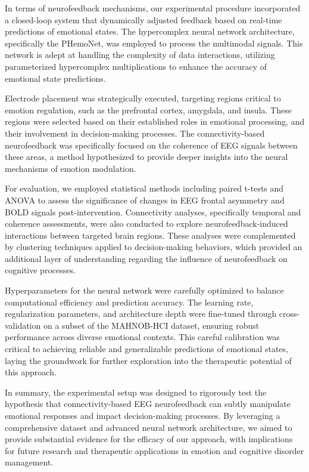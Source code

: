 \documentclass{article}
\begin{document}
In terms of neurofeedback mechanisms, our experimental procedure incorporated a closed-loop system that dynamically adjusted feedback based on real-time predictions of emotional states. The hypercomplex neural network architecture, specifically the PHemoNet, was employed to process the multimodal signals. This network is adept at handling the complexity of data interactions, utilizing parameterized hypercomplex multiplications to enhance the accuracy of emotional state predictions.

Electrode placement was strategically executed, targeting regions critical to emotion regulation, such as the prefrontal cortex, amygdala, and insula. These regions were selected based on their established roles in emotional processing, and their involvement in decision-making processes. The connectivity-based neurofeedback was specifically focused on the coherence of EEG signals between these areas, a method hypothesized to provide deeper insights into the neural mechanisms of emotion modulation.

For evaluation, we employed statistical methods including paired t-tests and ANOVA to assess the significance of changes in EEG frontal asymmetry and BOLD signals post-intervention. Connectivity analyses, specifically temporal and coherence assessments, were also conducted to explore neurofeedback-induced interactions between targeted brain regions. These analyses were complemented by clustering techniques applied to decision-making behaviors, which provided an additional layer of understanding regarding the influence of neurofeedback on cognitive processes.

Hyperparameters for the neural network were carefully optimized to balance computational efficiency and prediction accuracy. The learning rate, regularization parameters, and architecture depth were fine-tuned through cross-validation on a subset of the MAHNOB-HCI dataset, ensuring robust performance across diverse emotional contexts. This careful calibration was critical to achieving reliable and generalizable predictions of emotional states, laying the groundwork for further exploration into the therapeutic potential of this approach.

In summary, the experimental setup was designed to rigorously test the hypothesis that connectivity-based EEG neurofeedback can subtly manipulate emotional responses and impact decision-making processes. By leveraging a comprehensive dataset and advanced neural network architecture, we aimed to provide substantial evidence for the efficacy of our approach, with implications for future research and therapeutic applications in emotion and cognitive disorder management.
\end{document}

